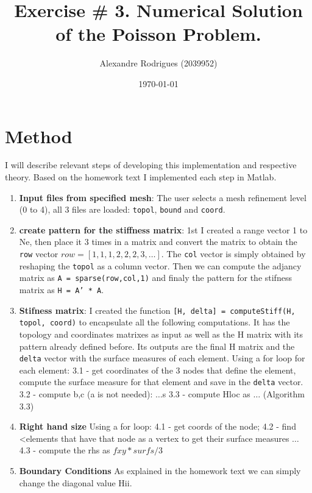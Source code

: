 \documentclass[a4paper, 11pt]{article}
\begin{document}
	
	\title{Exercise \# 3. Numerical Solution of the Poisson Problem. }
	\author{{\small Alexandre Rodrigues (2039952)}}
	\date{\today}
	
	\maketitle
		\section{Method}
			I will describe relevant steps of developing this implementation and respective theory.
			Based on the homework text I implemented each step in Matlab.
			
			\begin{enumerate}
				\item \textbf{Input files from specified mesh}: The user selects a mesh refinement level (0 to 4), all 3 files are loaded: \texttt{topol}, \texttt{bound} and \texttt{coord}.	
				\item \textbf{create pattern for the stiffness matrix}: 1st I created a range vector 1 to Ne, then place it 3 times in a matrix and convert the matrix to obtain the \texttt{row} vector $ row = [1,1,1,2,2,2,3,\ldots] $. The \texttt{col} vector is simply obtained by reshaping the \texttt{topol} as a column vector. Then we can compute the adjancy matrix as \texttt{A = sparse(row,col,1)} and finaly the pattern for the stifness matrix as \texttt{H = A' * A}.
				\item \textbf{Stifness matrix}:
				I created the function \texttt{[H, delta] = computeStiff(H, topol, coord)} to encapsulate all the following computations.
				It has the topology and coordinates matrixes as input as well as the H matrix with its pattern already defined before.
				Its outputs are the final H matrix and the \texttt{delta} vector with the surface measures of each element.
				Using a for loop for each element:
				3.1 - get coordinates of the 3 nodes that define the element, compute the surface measure for that element and save in the \texttt{delta} vector.
				3.2 - compute b,c (a is not needed): $\ldots$s
				3.3 - compute Hloc as $\ldots$ (Algorithm 3.3)
				\item  \textbf{Right hand size}
				Using a for loop:
				4.1 - get coords of the node;
				4.2 - find <elements that have that node as a vertex to get their surface measures
				$\ldots$
				4.3 - compute the rhs as $fxy * surfs/3 $
				\item \textbf{Boundary Conditions}
				As explained in the homework text we can simply change the diagonal value Hii.

\end{enumerate}
\end{document}
